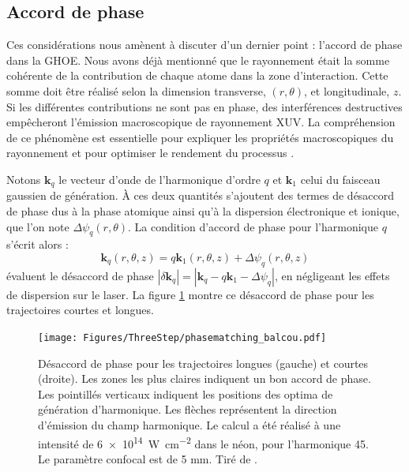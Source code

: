 \subsection{Accord de phase}
Ces considérations nous amènent à discuter d'un dernier point : l'accord de phase dans la GHOE. Nous avons déjà mentionné que le rayonnement était la somme cohérente de la contribution de chaque atome dans la zone d'interaction. Cette somme doit être réalisé selon la dimension transverse, $(r,\theta)$, et longitudinale, $z$. Si les différentes contributions ne sont pas en phase, des interférences destructives empêcheront l'émission macroscopique de rayonnement XUV. La compréhension de ce phénomène est essentielle pour expliquer les propriétés macroscopiques du rayonnement  et pour optimiser le rendement du processus .

Notons $\bm{k}_q$ le vecteur d'onde de l'harmonique d'ordre $q$ et $\bm{k}_1$ celui du faisceau gaussien de génération. \`A ces deux quantités s'ajoutent des termes de désaccord de phase dus à la phase atomique ainsi qu'à la dispersion électronique et ionique, que l'on note $\Delta \psi_q(r,\theta)$. La condition d'accord de phase pour l'harmonique $q$ s'écrit alors  :
\begin{equation}
\bm{k}_q(r,\theta,z) = q\bm{k}_1(r,\theta,z) + \Delta \psi_q(r,\theta,z)
\end{equation}
 évaluent le désaccord de phase $|\delta \bm{k}_q| = |\bm{k}_q-q\bm{k}_1 - \Delta \psi_q|$, en négligeant les effets de dispersion sur le laser. La figure \ref{fig:balcou} montre ce désaccord de phase pour les trajectoires courtes et longues. 

\begin{figure}[!ht]
\centering
\texttt{[image: Figures/ThreeStep/phasematching\_balcou.pdf]}%
\caption{Désaccord de phase pour les trajectoires longues (gauche) et courtes (droite). Les zones les plus claires indiquent un bon accord de phase. Les pointillés verticaux indiquent les positions des optima de génération d'harmonique. Les flèches représentent la direction d'émission du champ harmonique. Le calcul a été réalisé à une intensité de \SI{6e14}{\W\per\cm\squared} dans le néon, pour l'harmonique 45. Le paramètre confocal est de 5 mm. Tiré de .}
\label{fig:balcou}
\end{figure}

